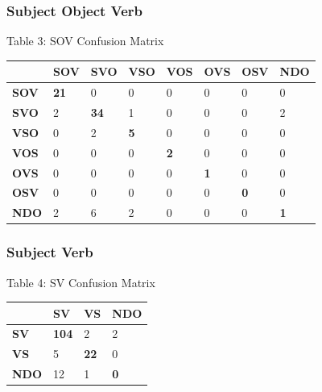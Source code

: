 \documentclass[]{article}
\begin{document}
\subsubsection{Subject Object Verb}
\begin{center}
Table 3: SOV Confusion Matrix
\end{center}
\begin{flushleft}
\begin{tabularx}{\textwidth}{|X|X|X|X|X|X|X|X|}
\hline
& \textbf{SOV} & \textbf{SVO} & \textbf{VSO} & \textbf{VOS} & \textbf{OVS} & \textbf{OSV} & \textbf{NDO} \\ \hline
\textbf{SOV} & \textbf{21}  & 0   & 0   & 0   & 0   & 0   & 0  \\ \hline
\textbf{SVO} & 2   & \textbf{34}  & 1   & 0   & 0   & 0   & 2  \\ \hline
\textbf{VSO} & 0   & 2   & \textbf{5}   & 0   & 0   & 0   & 0  \\ \hline
\textbf{VOS} & 0   & 0   & 0   & \textbf{2}   & 0   & 0   & 0  \\ \hline
\textbf{OVS} & 0   & 0   & 0   & 0   & \textbf{1}   & 0   & 0  \\ \hline
\textbf{OSV} & 0   & 0   & 0   & 0   & 0   & \textbf{0}   & 0  \\ \hline
\textbf{NDO} & 2   & 6   & 2   & 0   & 0   & 0   & \textbf{1}  \\ \hline
\end{tabularx}
\end{flushleft}
\vspace{0.6cm}

\subsubsection{Subject Verb}
\begin{center}
Table 4: SV Confusion Matrix
\end{center}
\begin{flushleft}
\begin{tabularx}{\textwidth}{|X|X|X|X|}
\hline
& \textbf{SV} & \textbf{VS} & \textbf{NDO} \\ \hline
\textbf{SV} & \textbf{104}  & 2   & 2   \\ \hline
\textbf{VS} & 5   & \textbf{22}  & 0   \\ \hline
\textbf{NDO} & 12   & 1   & \textbf{0}   \\ \hline
\end{tabularx}
\end{flushleft}
\vspace{0.6cm}
\end{document}
